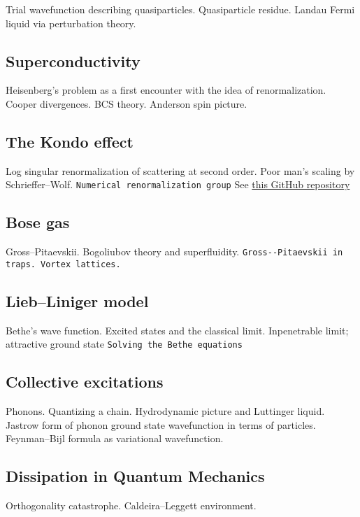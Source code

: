 Trial wavefunction describing quasiparticles. Quasiparticle residue. Landau Fermi liquid via perturbation theory. 

\subsection{Superconductivity}

Heisenberg's problem as a first encounter with the idea of renormalization. Cooper divergences. BCS theory. Anderson spin picture.

\subsection{The Kondo effect}

Log singular renormalization of scattering at second order. Poor man's scaling by Schrieffer--Wolf. \verb|Numerical renormalization group| See \href{https://github.com/LucasNogueiraMartins/NRG-Didactic}{this GitHub repository}

\subsection{Bose gas}

Gross--Pitaevskii. Bogoliubov theory and superfluidity. \verb|Gross--Pitaevskii in traps. Vortex lattices.|

\subsection{Lieb--Liniger model}

Bethe's wave function. Excited states and the classical limit. Inpenetrable limit; attractive ground state \verb|Solving the Bethe equations|

\subsection{Collective excitations}

Phonons. Quantizing a chain. Hydrodynamic picture and Luttinger liquid. Jastrow form of phonon ground state wavefunction in terms of particles. Feynman–Bijl formula as variational wavefunction. 

\subsection{Dissipation in Quantum Mechanics}

Orthogonality catastrophe. Caldeira--Leggett environment.


